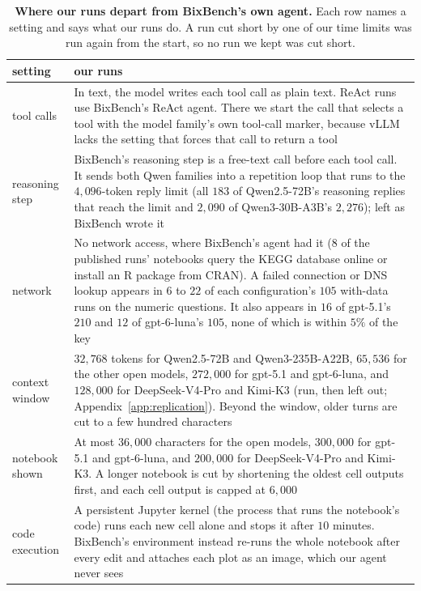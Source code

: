 \documentclass{article}
\begin{document}
\begin{table}[htbp]
\centering\footnotesize
\caption{\textbf{Where our runs depart from BixBench's own agent.} Each row names a setting and says what our runs
do. A run cut short by one of our time limits was run again from the start, so no run we kept was cut short.}
\label{tab:settings}
\begin{tabularx}{\linewidth}{@{}>{\raggedright\arraybackslash}p{2.0cm}>{\raggedright\arraybackslash}X@{}}
\toprule
setting & our runs\\
\midrule
tool calls & In text, the model writes each tool call as plain text. ReAct runs use BixBench's ReAct agent. There we
start the call that selects a tool with the model family's own tool-call marker, because vLLM lacks the setting that
forces that call to return a tool\\
reasoning step & BixBench's reasoning step is a free-text call before each tool call. It sends both Qwen families into
a repetition loop that runs to the $4{,}096$-token reply limit (all $183$ of Qwen2.5-72B's reasoning replies that
reach the limit and $2{,}090$ of Qwen3-30B-A3B's $2{,}276$); left as BixBench wrote it\\
network & No network access, where BixBench's agent had it ($8$ of the published runs' notebooks query the KEGG
database online or install an R package from CRAN). A failed connection or DNS lookup appears in $6$ to $22$ of each
configuration's $105$ with-data runs on the numeric questions. It also appears in $16$ of gpt-5.1's $210$ and $12$ of
gpt-6-luna's $105$, none of which is within $5\%$ of the key\\
context window & $32{,}768$ tokens for Qwen2.5-72B and Qwen3-235B-A22B, $65{,}536$ for the other open models,
$272{,}000$ for gpt-5.1 and gpt-6-luna, and $128{,}000$ for DeepSeek-V4-Pro and Kimi-K3 (run, then left out;
Appendix~\ref{app:replication}). Beyond the window, older turns are cut to a few hundred characters\\
notebook shown & At most $36{,}000$ characters for the open models, $300{,}000$ for gpt-5.1 and gpt-6-luna, and
$200{,}000$ for DeepSeek-V4-Pro and Kimi-K3. A longer notebook is cut by shortening the oldest cell outputs first,
and each cell output is capped at $6{,}000$\\
code execution & A persistent Jupyter kernel (the process that runs the notebook's code) runs each new cell alone and
stops it after $10$ minutes. BixBench's environment instead re-runs the whole notebook after every edit and attaches
each plot as an image, which our agent never sees\\

\end{tabularx}
\end{table}
\end{document}
